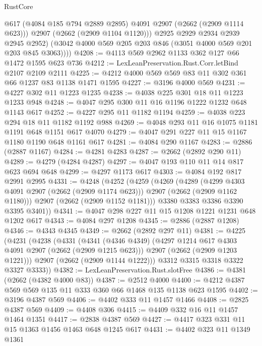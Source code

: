 \begin{lexlean}{RustCore}
\begin{coremodule}
              @617
              (@4084 @185 @794 @2889 @2895)
              @4091
              @2907
              (@2662 (@2909 @1114 @623)))
            @2907
            (@2662 (@2909 @1104 @1120)))
          @2925
          @2929
          @2934
          @2939
          @2945
          @2952)
        (@3042 @4000 @569 @205 @203 @846 (@3051 @4000 @569 @201 @203 @845 @3063))))
@4208 := @4113 @569 @2962 @1133 @362 @127 @66 @1472 @1595 @623 @736
@4212 := LexLeanPreservation.Rust.Corr.letBind @2107 @2109 @2111
@4225 := @4212 @4000 @569 @569 @83 @11 @302 @361 @66 @1237 @83 @1138 @1471 @1595
@4227 := @3196 @4000 @569
@4231 := @4227 @302 @11 @1223 @1235
@4238 := @4038 @225 @301 @18 @11 @1223 @1233 @948
@4248 := @4047 @295 @300 @11 @16 @1196 @1222 @1232 @648 @1143 @617
@4252 := @4227 @295 @11 @1182 @1194
@4259 := @4038 @223 @294 @18 @11 @1182 @1192 @988
@4269 := @4048 @293 @11 @16 @1075 @1181 @1191 @648 @1151 @617 @4070
@4279 := @4047 @291 @227 @11 @15 @1167 @1180 @1190 @648 @1161 @617
@4281 := @4084 @290 @1167
@4283 := @2886 (@2887 @1167)
@4284 := @4281 @4283
@4287 := @2662 (@2892 @290 @11)
@4289 := @4279 (@4284 @4287)
@4297 := @4047 @193 @110 @11 @14 @817 @623 @694 @648
@4299 := @4297 @1173 @617
@4303 := @4084 @192 @817 @2991 @2995
@4331 := @4248
    (@4252
      (@4259
        (@4269
          (@4289
            (@4299 @4303 @4091 @2907 (@2662 (@2909 @1174 @623)))
            @2907
            (@2662 (@2909 @1162 @1180)))
          @2907
          (@2662 (@2909 @1152 @1181)))
        @3380
        @3383
        @3386
        @3390
        @3395
        @3401))
@4341 := @4047 @298 @227 @11 @15 @1208 @1221 @1231 @648 @1202 @617
@4343 := @4084 @297 @1208
@4345 := @2886 (@2887 @1208)
@4346 := @4343 @4345
@4349 := @2662 (@2892 @297 @11)
@4381 := @4225
    (@4231
      (@4238
        (@4331
          (@4341
            (@4346 @4349)
            (@4297 @1214 @617 @4303 @4091 @2907 (@2662 (@2909 @1215 @623)))
            @2907
            (@2662 (@2909 @1203 @1221)))
          @2907
          (@2662 (@2909 @1144 @1222)))
        @3312
        @3315
        @3318
        @3322
        @3327
        @3333))
@4382 := LexLeanPreservation.Rust.slotFree
@4386 := @4381 (@2662 (@4382 @4000 @83))
@4387 := @2512 @4000
@4400 := @4212 @4387 @569 @569 @135 @11 @333 @360 @66 @1468 @135 @1138 @623 @1595
@4402 := @3196 @4387 @569
@4406 := @4402 @333 @11 @1457 @1466
@4408 := @2825 @4387 @569
@4409 := @4408 @306
@4415 := @4409 @332 @16 @11 @1457 @1464 @1351
@4417 := @2838 @4387 @569
@4427 := @4417 @323 @331 @11 @15 @1363 @1456 @1463 @648 @1245 @617
@4431 := @4402 @323 @11 @1349 @1361

\end{coremodule}
\end{lexlean}
